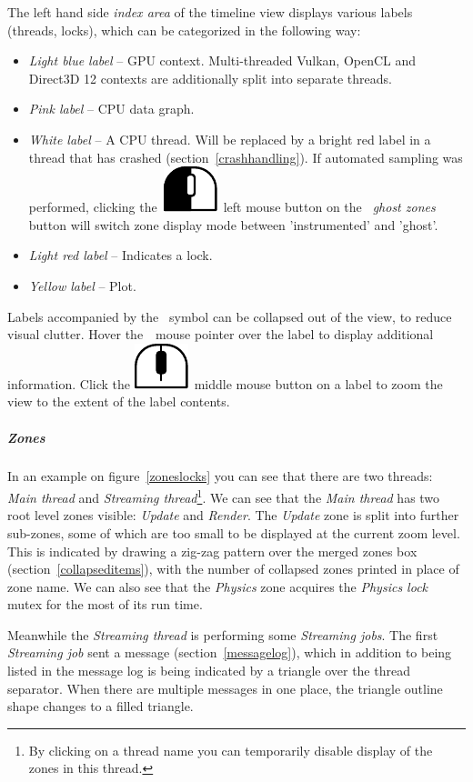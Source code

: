 \documentclass[hidelinks,titlepage,a4paper]{article}
\newcommand{\LMB}{\includegraphics[height=.8\baselineskip]{icons/lmb}}
\newcommand{\MMB}{\includegraphics[height=.8\baselineskip]{icons/mmb}}
\begin{document}
The left hand side \emph{index area} of the timeline view displays various labels (threads, locks), which can be categorized in the following way:

\begin{itemize}
\item \emph{Light blue label} -- GPU context. Multi-threaded Vulkan, OpenCL and Direct3D 12 contexts are additionally split into separate threads.
\item \emph{Pink label} -- CPU data graph.
\item \emph{White label} -- A CPU thread. Will be replaced by a bright red label in a thread that has crashed (section~\ref{crashhandling}). If automated sampling was performed, clicking the~\LMB{}~left mouse button on the \emph{\faGhost{}~ghost zones} button will switch zone display mode between 'instrumented' and 'ghost'.
\item \emph{Light red label} -- Indicates a lock.
\item \emph{Yellow label} -- Plot.
\end{itemize}

Labels accompanied by the \faCaretDown{}~symbol can be collapsed out of the view, to reduce visual clutter. Hover the~\faMousePointer{}~mouse pointer over the label to display additional information. Click the \MMB{}~middle mouse button on a label to zoom the view to the extent of the label contents.

\subparagraph{Zones}

In an example on figure~\ref{zoneslocks} you can see that there are two threads: \emph{Main thread} and \emph{Streaming thread}\footnote{By clicking on a thread name you can temporarily disable display of the zones in this thread.}. We can see that the \emph{Main thread} has two root level zones visible: \emph{Update} and \emph{Render}. The \emph{Update} zone is split into further sub-zones, some of which are too small to be displayed at the current zoom level. This is indicated by drawing a zig-zag pattern over the merged zones box (section~\ref{collapseditems}), with the number of collapsed zones printed in place of zone name. We can also see that the \emph{Physics} zone acquires the \emph{Physics lock} mutex for the most of its run time.

Meanwhile the \emph{Streaming thread} is performing some \emph{Streaming jobs}. The first \emph{Streaming job} sent a message (section~\ref{messagelog}), which in addition to being listed in the message log is being indicated by a triangle over the thread separator. When there are multiple messages in one place, the triangle outline shape changes to a filled triangle.
\end{document}
